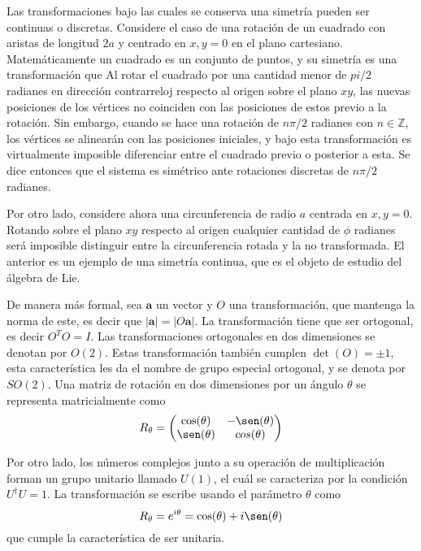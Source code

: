 Las transformaciones bajo las cuales se conserva una simetría pueden ser continuas o discretas. Considere el caso de una rotación de un cuadrado con aristas de longitud $2a$ y centrado en $x,y=0$ en el plano cartesiano. Matemáticamente un cuadrado es un conjunto de puntos, y su simetría es una transformación que  Al rotar el cuadrado por una cantidad menor de $pi/2$ radianes en dirección contrarreloj respecto al origen sobre el plano $xy$, las nuevas posiciones de los vértices no coinciden con las posiciones de estos previo a la rotación. Sin embargo, cuando se hace una rotación de $n\pi/2$ radianes con $n\in \mathbb{Z}$, los vértices se alinearán con las posiciones iniciales, y bajo esta transformación es virtualmente imposible diferenciar entre el cuadrado previo o posterior a esta. Se dice entonces que el sistema es simétrico ante rotaciones discretas de $n\pi/2$ radianes.

Por otro lado, considere ahora una circunferencia de radio $a$ centrada en $x,y=0$. Rotando sobre el plano $xy$ respecto al origen cualquier cantidad de $\phi$ radianes será imposible distinguir entre la circunferencia rotada y la no transformada. El anterior es un ejemplo de una simetría continua, que es el objeto de estudio del álgebra de Lie.

De manera más formal, sea $\mathbf{a}$ un vector y $O$ una transformación, que mantenga la norma de este, es decir que $|\mathbf{a}| = |O\mathbf{a}|$. La transformación tiene que ser ortogonal, es decir $O^{T}O = I$. Las transformaciones ortogonales en dos dimensiones se denotan por $O(2)$. Estas transformación también cumplen $\det(O) = \pm 1$, esta característica les da el nombre de grupo especial ortogonal, y se denota por $SO(2)$. Una matriz de rotación en dos dimensiones por un ángulo $\theta$ se representa matricialmente como
\begin{equation*}
  R_\theta = \begin{pmatrix}
    \cos(\theta) & -\sen(\theta) \\
    \sen(\theta) & cos(\theta)
  \end{pmatrix}
\end{equation*}

Por otro lado, los números complejos junto a su operación de multiplicación forman un grupo unitario llamado $U(1)$, el cuál se caracteriza por la condición $U^\dagger U = 1$. La transformación se escribe usando el parámetro $\theta$ como
\begin{equation*}
  R_\theta = e^{i\theta} = \cos(\theta) + i\sen(\theta)
\end{equation*}
que cumple la característica de ser unitaria.

